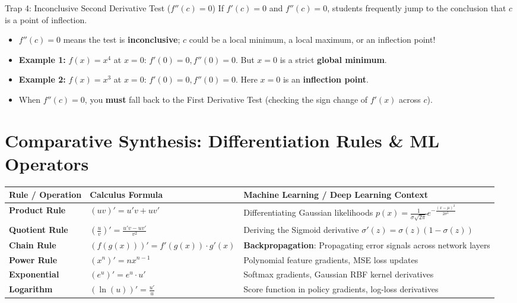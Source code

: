 \begin{trapbox}{Trap 4: Inconclusive Second Derivative Test ($f''(c) = 0$)}
If $f'(c) = 0$ and $f''(c) = 0$, students frequently jump to the conclusion that $c$ is a point of inflection.
\begin{itemize}
    \item $f''(c) = 0$ means the test is \textbf{inconclusive}; $c$ could be a local minimum, a local maximum, or an inflection point!
    \item \textbf{Example 1:} $f(x) = x^4$ at $x = 0$: $f'(0) = 0, f''(0) = 0$. But $x=0$ is a strict \textbf{global minimum}.
    \item \textbf{Example 2:} $f(x) = x^3$ at $x = 0$: $f'(0) = 0, f''(0) = 0$. Here $x=0$ is an \textbf{inflection point}.
    \item When $f''(c) = 0$, you \textbf{must} fall back to the First Derivative Test (checking the sign change of $f'(x)$ across $c$).
\end{itemize}
\end{trapbox}

\section{Comparative Synthesis: Differentiation Rules \& ML Operators}

\begin{center}
\renewcommand{\arraystretch}{1.3}
\begin{tabular}{p{2.8cm}p{4.2cm}p{4.2cm}}
\toprule
\textbf{Rule / Operation} & \textbf{Calculus Formula} & \textbf{Machine Learning / Deep Learning Context} \\
\midrule
\textbf{Product Rule} & $(uv)' = u'v + uv'$ & Differentiating Gaussian likelihoods $p(x) = \frac{1}{\sigma \sqrt{2\pi}} e^{-\frac{(x-\mu)^2}{2\sigma^2}}$ \\
\textbf{Quotient Rule} & $\left(\frac{u}{v}\right)' = \frac{u'v - uv'}{v^2}$ & Deriving the Sigmoid derivative $\sigma'(z) = \sigma(z)(1 - \sigma(z))$ \\
\textbf{Chain Rule} & $(f(g(x)))' = f'(g(x)) \cdot g'(x)$ & \textbf{Backpropagation}: Propagating error signals across network layers \\
\textbf{Power Rule} & $(x^n)' = n x^{n-1}$ & Polynomial feature gradients, MSE loss updates \\
\textbf{Exponential} & $(e^u)' = e^u \cdot u'$ & Softmax gradients, Gaussian RBF kernel derivatives \\
\textbf{Logarithm} & $(\ln(u))' = \frac{u'}{u}$ & Score function in policy gradients, log-loss derivatives \\
\bottomrule
\end{tabular}
\end{center}


